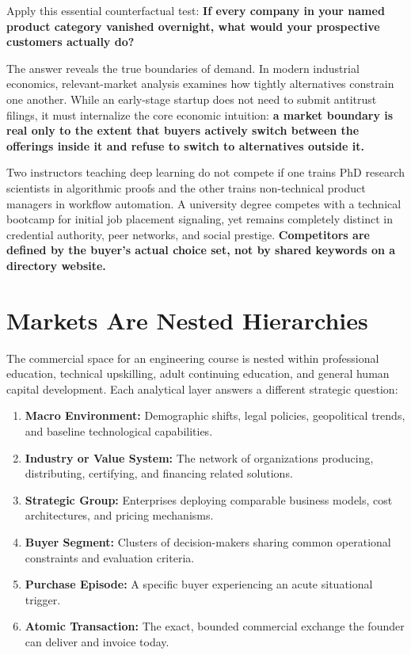 Apply this essential counterfactual test: \textbf{If every company in your named product category vanished overnight, what would your prospective customers actually do?}

The answer reveals the true boundaries of demand. In modern industrial economics, relevant-market analysis examines how tightly alternatives constrain one another. While an early-stage startup does not need to submit antitrust filings, it must internalize the core economic intuition: \textbf{a market boundary is real only to the extent that buyers actively switch between the offerings inside it and refuse to switch to alternatives outside it.}

Two instructors teaching deep learning do not compete if one trains PhD research scientists in algorithmic proofs and the other trains non-technical product managers in workflow automation. A university degree competes with a technical bootcamp for initial job placement signaling, yet remains completely distinct in credential authority, peer networks, and social prestige. \textbf{Competitors are defined by the buyer's actual choice set, not by shared keywords on a directory website.}

\section{Markets Are Nested Hierarchies}

The commercial space for an engineering course is nested within professional education, technical upskilling, adult continuing education, and general human capital development. Each analytical layer answers a different strategic question:

\begin{enumerate}[leftmargin=12pt,itemsep=2pt,topsep=1pt,parsep=0pt]
  \item \textbf{Macro Environment:} Demographic shifts, legal policies, geopolitical trends, and baseline technological capabilities.
  \item \textbf{Industry or Value System:} The network of organizations producing, distributing, certifying, and financing related solutions.
  \item \textbf{Strategic Group:} Enterprises deploying comparable business models, cost architectures, and pricing mechanisms.
  \item \textbf{Buyer Segment:} Clusters of decision-makers sharing common operational constraints and evaluation criteria.
  \item \textbf{Purchase Episode:} A specific buyer experiencing an acute situational trigger.
  \item \textbf{Atomic Transaction:} The exact, bounded commercial exchange the founder can deliver and invoice today.
\end{enumerate}

